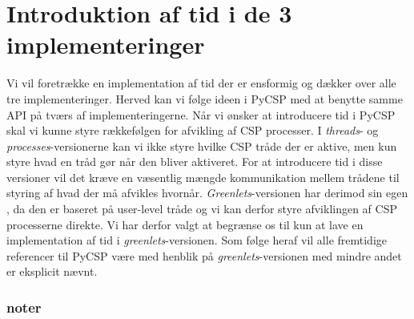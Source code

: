 \section{Introduktion af tid i de 3 implementeringer}
Vi vil foretrække en implementation af tid der er ensformig og dækker over alle tre implementeringer. Herved kan vi følge ideen i PyCSP med at benytte samme API på tværs af implementeringerne. Når vi ønsker at introducere tid i PyCSP skal vi kunne styre rækkefølgen for afvikling af CSP processer. I  \emph{threads}- og \emph{processes}-versionerne kan vi ikke styre hvilke CSP tråde der er aktive, men kun styre hvad en tråd gør når den bliver aktiveret. For at introducere tid i disse versioner vil det kræve en væsentlig mængde kommunikation mellem trådene til styring af hvad der må afvikles hvornår. \emph{Greenlets}-versionen har derimod sin egen \sched , da den er baseret på user-level tråde og vi kan derfor styre afviklingen af CSP processerne direkte. Vi har derfor valgt at begrænse os til kun at lave en implementation af tid i \emph{greenlets}-versionen. Som følge heraf vil alle fremtidige referencer til PyCSP være med henblik på \emph{greenlets}-versionen med mindre andet er eksplicit nævnt.

\subsubsection{noter}





